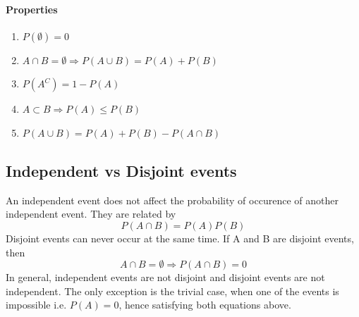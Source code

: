 \documentclass[../Probability.tex]{subfiles}
\begin{document}
\paragraph{Properties}
\begin{enumerate}
    \item $P(\emptyset) = 0$
    \item $A \cap B = \emptyset \Rightarrow P(A \cup B) = P(A) + P(B)$
    \item $P(A^C) = 1 - P(A)$
    \item $A \subset B \Rightarrow P(A) \leq P(B)$
    \item $P(A \cup B) = P(A) + P(B) - P(A \cap B)$
\end{enumerate}

\subsection{Independent vs Disjoint events}
An independent event does not affect the probability of occurence of another independent event. They are related by
\[P(A \cap B) = P(A)P(B)\]
Disjoint events can never occur at the same time.
If A and B are disjoint events, then
\[A \cap B = \emptyset \Rightarrow P(A \cap B) = 0\]
In general, independent events are not disjoint and disjoint events are not independent.
The only exception is the trivial case, when one of the events is impossible i.e. $P(A)=0$, hence satisfying both equations above.
\end{document}
